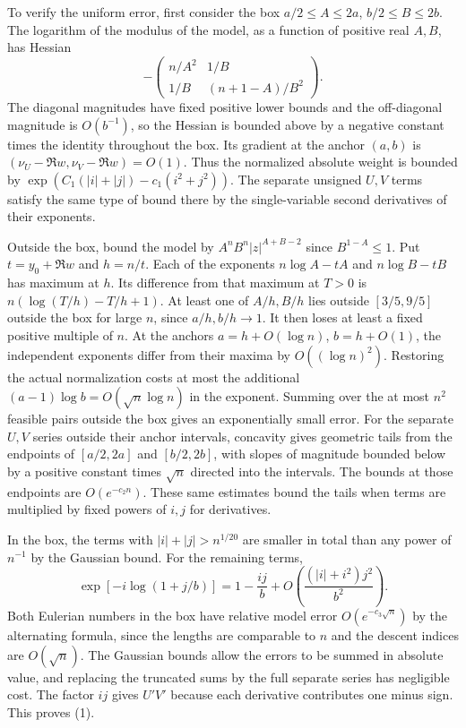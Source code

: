 \documentclass[11pt]{article}
\begin{document}
To verify the uniform error, first consider the box $a/2\le A\le2a$, $b/2\le B\le2b$. The logarithm of the modulus of the model, as a function of positive real $A,B$, has Hessian
\[
 -\begin{pmatrix} n/A^2 & 1/B\\[2pt] 1/B &(n+1-A)/B^2\end{pmatrix}.
\]
The diagonal magnitudes have fixed positive lower bounds and the off-diagonal magnitude is $O(b^{-1})$, so the Hessian is bounded above by a negative constant times the identity throughout the box. Its gradient at the anchor $(a,b)$ is $(\nu_U-\Re w,\nu_V-\Re w)=O(1)$. Thus the normalized absolute weight is bounded by $\exp(C_1(|i|+|j|)-c_1(i^2+j^2))$. The separate unsigned $U,V$ terms satisfy the same type of bound there by the single-variable second derivatives of their exponents.

Outside the box, bound the model by $A^nB^n|z|^{A+B-2}$ since $B^{1-A}\le1$. Put $t=y_0+\Re w$ and $h=n/t$. Each of the exponents $n\log A-tA$ and $n\log B-tB$ has maximum at $h$. Its difference from that maximum at $T>0$ is $n(\log(T/h)-T/h+1)$. At least one of $A/h,B/h$ lies outside $[3/5,9/5]$ outside the box for large $n$, since $a/h,b/h\to1$. It then loses at least a fixed positive multiple of $n$. At the anchors $a=h+O(\log n)$, $b=h+O(1)$, the independent exponents differ from their maxima by $O((\log n)^2)$. Restoring the actual normalization costs at most the additional $(a-1)\log b=O(\sqrt n\log n)$ in the exponent. Summing over the at most $n^2$ feasible pairs outside the box gives an exponentially small error. For the separate $U,V$ series outside their anchor intervals, concavity gives geometric tails from the endpoints of $[a/2,2a]$ and $[b/2,2b]$, with slopes of magnitude bounded below by a positive constant times $\sqrt n$ directed into the intervals. The bounds at those endpoints are $O(e^{-c_2 n})$. These same estimates bound the tails when terms are multiplied by fixed powers of $i,j$ for derivatives.

In the box, the terms with $|i|+|j|>n^{1/20}$ are smaller in total than any power of $n^{-1}$ by the Gaussian bound. For the remaining terms,
\[
 \exp[-i\log(1+j/b)]
  =1-\frac{ij}{b}
   +O\!\left(\frac{(|i|+i^2)j^2}{b^2}\right).
\]
Both Eulerian numbers in the box have relative model error $O(e^{-c_3\sqrt n})$ by the alternating formula, since the lengths are comparable to $n$ and the descent indices are $O(\sqrt n)$. The Gaussian bounds allow the errors to be summed in absolute value, and replacing the truncated sums by the full separate series has negligible cost. The factor $ij$ gives $U'V'$ because each derivative contributes one minus sign. This proves (1).
\end{document}
